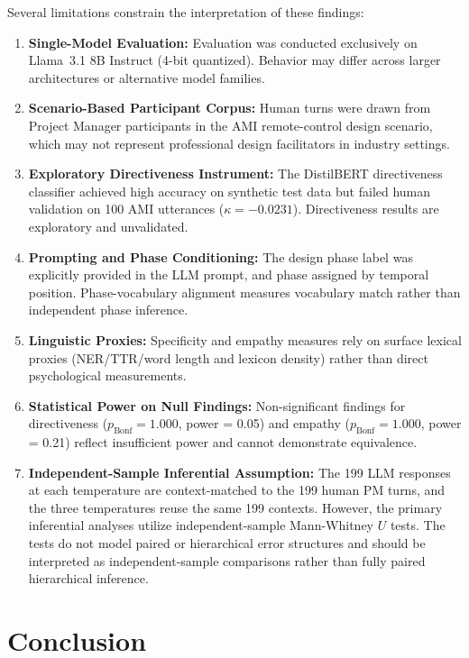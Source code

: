 \documentclass[preprint,12pt,authoryear]{elsarticle}
\begin{document}
Several limitations constrain the interpretation of these findings:
\begin{enumerate}
    \item \textbf{Single-Model Evaluation:} Evaluation was conducted exclusively on Llama~3.1 8B Instruct (4-bit quantized). Behavior may differ across larger architectures or alternative model families.
    \item \textbf{Scenario-Based Participant Corpus:} Human turns were drawn from Project Manager participants in the AMI remote-control design scenario, which may not represent professional design facilitators in industry settings.
    \item \textbf{Exploratory Directiveness Instrument:} The DistilBERT directiveness classifier achieved high accuracy on synthetic test data but failed human validation on 100 AMI utterances ($\kappa = -0.0231$). Directiveness results are exploratory and unvalidated.
    \item \textbf{Prompting and Phase Conditioning:} The design phase label was explicitly provided in the LLM prompt, and phase assigned by temporal position. Phase-vocabulary alignment measures vocabulary match rather than independent phase inference.
    \item \textbf{Linguistic Proxies:} Specificity and empathy measures rely on surface lexical proxies (NER/TTR/word length and lexicon density) rather than direct psychological measurements.
    \item \textbf{Statistical Power on Null Findings:} Non-significant findings for directiveness ($p_{\text{Bonf}} = 1.000$, power = 0.05) and empathy ($p_{\text{Bonf}} = 1.000$, power = 0.21) reflect insufficient power and cannot demonstrate equivalence.
    \item \textbf{Independent-Sample Inferential Assumption:} The 199 LLM responses at each temperature are context-matched to the 199 human PM turns, and the three temperatures reuse the same 199 contexts. However, the primary inferential analyses utilize independent-sample Mann-Whitney $U$ tests. The tests do not model paired or hierarchical error structures and should be interpreted as independent-sample comparisons rather than fully paired hierarchical inference.
\end{enumerate}

\section{Conclusion}
\end{document}
